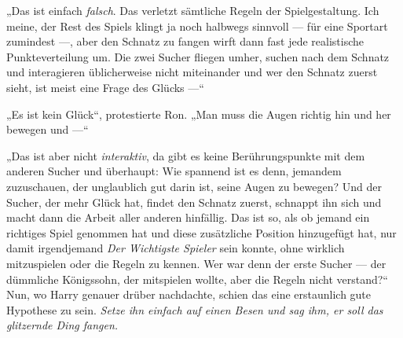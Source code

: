 „Das ist einfach \emph{falsch}. Das verletzt sämtliche Regeln der Spielgestaltung. Ich meine, der Rest des Spiels klingt ja noch halbwegs sinnvoll — für eine Sportart zumindest —, aber den Schnatz zu fangen wirft dann fast jede realistische Punkteverteilung um. Die zwei Sucher fliegen umher, suchen nach dem Schnatz und interagieren üblicherweise nicht miteinander und wer den Schnatz zuerst sieht, ist meist eine Frage des Glücks —“

„Es ist kein Glück“, protestierte Ron.
„Man muss die Augen richtig hin und her bewegen und —“

„Das ist aber nicht \emph{interaktiv}, da gibt es keine Berührungspunkte mit dem anderen Sucher und überhaupt: Wie spannend ist es denn, jemandem zuzuschauen, der unglaublich gut darin ist, seine Augen zu bewegen? Und der Sucher, der mehr Glück hat, findet den Schnatz zuerst, schnappt ihn sich und macht dann die Arbeit aller anderen hinfällig. Das ist so, als ob jemand ein richtiges Spiel genommen hat und diese zusätzliche Position hinzugefügt hat, nur damit irgendjemand \emph{Der Wichtigste Spieler} sein konnte, ohne wirklich mitzuspielen oder die Regeln zu kennen. Wer war denn der erste Sucher — der dümmliche Königssohn, der mitspielen wollte, aber die Regeln nicht verstand?“ Nun, wo Harry genauer drüber nachdachte, schien das eine erstaunlich gute Hypothese zu sein. \emph{Setze ihn einfach auf einen Besen und sag ihm, er soll das glitzernde Ding fangen.}

